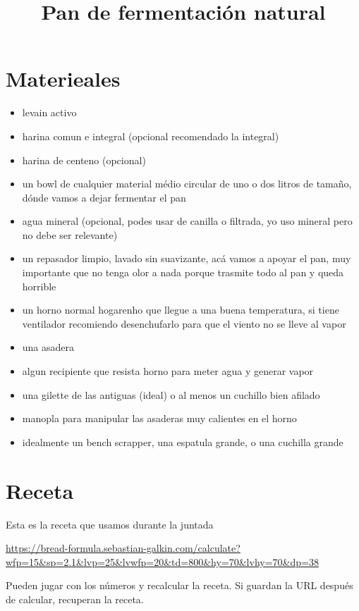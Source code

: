 \documentclass[10pt,a4paper]{article}
\title{Pan de fermentación natural}
\begin{document}
\maketitle
\tableofcontents

\section{Materieales}

\begin{itemize}
\item levain activo
\item  harina comun e integral (opcional recomendado la integral)
\item  harina de centeno (opcional)
\item  un bowl de cualquier material médio circular de uno o dos litros de tamaño, dónde vamos a dejar fermentar el pan
\item  agua mineral (opcional, podes usar de canilla o filtrada, yo uso mineral pero no debe ser relevante)
\item  un repasador limpio, lavado sin suavizante, acá vamos a apoyar el pan, muy importante que no tenga olor a nada porque trasmite todo al pan y queda horrible
\item  un horno normal hogarenho que llegue a una buena temperatura, si tiene ventilador recomiendo desenchufarlo para que el viento no se lleve al vapor
\item  una asadera
\item  algun recipiente que resista horno para meter agua y generar vapor
\item  una gilette de las antiguas (ideal) o al menos un cuchillo bien afilado
\item  manopla para manipular las asaderas muy calientes en el horno
\item  idealmente un bench scrapper, una espatula grande, o una cuchilla grande
\end{itemize}

\section{Receta}
Esta es la receta que usamos durante la juntada

\url{https://bread-formula.sebastian-galkin.com/calculate?wfp=15&sp=2.1&lvp=25&lvwfp=20&td=800&hy=70&lvhy=70&dp=38}

Pueden jugar con los números y recalcular la receta.  Si guardan la URL
después de calcular, recuperan la receta.
\end{document}
